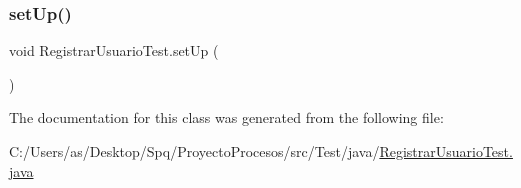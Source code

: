 \mbox{\label{class_registrar_usuario_test_a9ca8f19c0a72efcfb1e8dd2423a4c7f8}} 
\subsubsection{\texorpdfstring{setUp()}{setUp()}}
{\footnotesize\ttfamily void Registrar\+Usuario\+Test.\+set\+Up (\begin{DoxyParamCaption}{ }\end{DoxyParamCaption})}



The documentation for this class was generated from the following file\+:\begin{DoxyCompactItemize}
\item 
C\+:/\+Users/as/\+Desktop/\+Spq/\+Proyecto\+Procesos/src/\+Test/java/\mbox{\hyperlink{_registrar_usuario_test_8java}{Registrar\+Usuario\+Test.\+java}}\end{DoxyCompactItemize}
